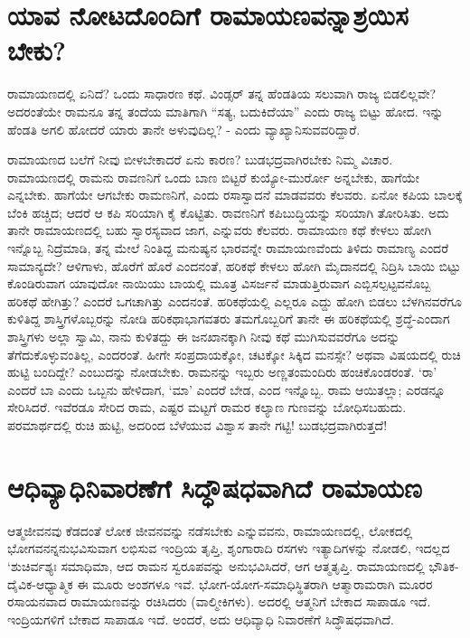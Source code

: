 \section*{ಯಾವ ನೋಟದೊಂದಿಗೆ ರಾಮಾಯಣವನ್ನಾಶ್ರಯಿಸ ಬೇಕು?}

ರಾಮಾಯಣದಲ್ಲಿ ಏನಿದೆ? ಒಂದು ಸಾಧಾರಣ ಕಥೆ. ವಿಂಡ್ಸರ್ ತನ್ನ ಹೆಂಡತಿಯ ಸಲುವಾಗಿ ರಾಜ್ಯ ಬಿಡಲಿಲ್ಲವೇ? ಅದರಂತೆಯೇ ರಾಮನೂ ತನ್ನ ತಂದೆಯ ಮಾತಿಗಾಗಿ ``ಸತ್ಯ, ಬದುಕಿದೆಯಾ'' ಎಂದು ರಾಜ್ಯ ಬಿಟ್ಟು ಹೋದ. ಇನ್ನು ಹೆಂಡತಿ ಅಗಲಿ ಹೋದರೆ ಯಾರು ತಾನೇ ಅಳುವುದಿಲ್ಲ? - ಎಂದು ವ್ಯಾಖ್ಯಾನಿಸುವವರಿದ್ದಾರೆ.

ರಾಮಾಯಣದ ಬಲೆಗೆ ನೀವು ಬೀಳಬೇಕಾದರೆ ಏನು ಕಾರಣ? ಬುಡಭದ್ರವಾಗಿರಬೇಕು ನಿಮ್ಮ ವಿಚಾರ. ರಾಮಾಯಣದಲ್ಲಿ ರಾಮನು ರಾವಣನಿಗೆ ಒಂದು ಬಾಣ ಬಿಟ್ಟರೆ ಕುಯ್ಯೋ-ಮುರ್ರೋ ಅನ್ನಬೇಕು, ಹಾಗೆಯೇ ಎನ್ನಬೇಕು. ಹಾಗೆಯೇ ಆಗಬೇಕು ರಾಮಣನಿಗೆ, ಎಂದು ರಸಾಸ್ವಾದನೆ ಮಾಡವವರು ಕೆಲವರು. ಏನೋ ಕಪಿಯ ಬಾಲಕ್ಕೆ ಬೆಂಕಿ ಹಚ್ಚಿದ; ಆದರೆ ಆ ಕಪಿ ಸರಿಯಾಗಿ ಕೈ ಕೊಟ್ಟಿತು. ರಾವಣನಿಗೆ ಕಪಿಬುದ್ಧಿಯನ್ನು ಸರಿಯಾಗಿ ತೋರಿಸಿತು. ಅದು ತಾನೇ ರಾಮಾಯಣದಲ್ಲಿ ಬಹು ಸ್ವಾರಸ್ಯವಾದ ಜಾಗ, ಎನ್ನುವರು ಕೆಲವರು. ರಾಮಾಯಣ ಕಥೆ ಕೇಳಲು ಹೋಗಿ ಇನ್ನೊಬ್ಬ ನಿದ್ರೆಮಾಡಿ, ತನ್ನ ಮೇಲೆ ನಿಂತಿದ್ದ ಮನುಷ್ಯನ ಭಾರವನ್ನೇ ರಾಮಾಯಣವೆಂದು ತಿಳಿದು ರಾಮಾಣ್ಯ ಎಂದರೆ ಸಾಮಾನ್ಯದೇ? ಆಳಿಗಾಳು, ಹೊರೆಗೆ ಹೊರೆ ಎಂದನಂತೆ, ಹರಿಕಥೆ ಕೇಳಲು ಹೋಗಿ ಮೈದಾನದಲ್ಲಿ ನಿದ್ರಿಸಿ ಬಾಯಿ ಬಿಟ್ಟು  ಕೊಂಡಿರುವಾಗ ಯಾವುದೋ ನಾಯಿಯು ಬಾಯಲ್ಲಿ ಮೂತ್ರ ವಿಸರ್ಜನೆ ಮಾಡುತ್ತಿರುವಾಗ ಎಬ್ಬಿಸಲ್ಪಟ್ಟವನೊಬ್ಬ ಹರಿಕಥೆ ಹೇಗಿತ್ತು? ಎಂದರೆ ಒಗಚಾಗಿತ್ತು ಎಂದನಂತೆ. ಹರಿಕಥೆಯಲ್ಲಿ ಎಲ್ಲರೂ ಎದ್ದು ಹೋಗಿ ಬಿಡಲು ಬೆಳಗಿನವರೆಗೂ ಕುಳಿತಿದ್ದ ಶಾಸ್ತ್ರಿಗಳೊಬ್ಬರನ್ನು ನೋಡಿ ಹರಿಕಥಾಭಾಗವತರು ತಮಗೊಬ್ಬರಿಗೆ ತಾನೇ ಈ ಹರಿಕಥೆಯಲ್ಲಿ ಶ್ರದ್ಧೆ-ಎಂದಾಗ ಶಾಸ್ತ್ರಿಗಳು ಅಲ್ಲಾ ಸ್ವಾಮಿ, ನಾನು ಕುಳಿತದ್ದು ಈ ಜನಖಾನಕ್ಕಾಗಿ ನೀವು ಕಥೆ ಮುಗಿಸುವವರೆಗೂ ಅದನ್ನು ತೆಗೆದುಕೊಳ್ಳುವಂತಿಲ್ಲ, ಎಂದರಂತೆ. ಹೀಗೇ ಸಂಪ್ರದಾಯಕ್ಕೋ, ಚಟಕ್ಕೋ ಸಿಕ್ಕಿದ ಮನಸ್ಸೇ? ಅಥವಾ ವಿಷಯದಲ್ಲಿ ರುಚಿ ಹುಟ್ಟಿ ಬಂದಿದ್ದೇ? ಎಂಬುದನ್ನು ನೋಡಬೇಕು. ರಾಮನನ್ನು ಇಬ್ಬರು ಅಣ್ಣತಂಮಂದಿರು ಹಂಚಿಕೊಂಡರಂತೆ. `ರಾ' ಎಂದರೆ ಬಾ ಎಂದು ಒಬ್ಬನು ಹೇಳಿದಾಗ, `ಮಾ' ಎಂದರೆ ಬೇಡ, ಎಂದ ಇನ್ನೊಬ್ಬ. ರಾಮ ಆಯಿತಲ್ಲಾ; ಎರಡನ್ನೂ ಸೇರಿಸಿದರೆ. ಇವೆರಡೂ ಸೇರಿದ ರಾಮ, ಎಷ್ಟರ ಮಟ್ಟಗೆ ರಾಮರ ಕಲ್ಯಾಣ ಗುಣವನ್ನು ಬೋಧಿಸಬಹುದು. ಪರಮಾರ್ಥದಲ್ಲಿ ರುಚಿ ಹುಟ್ಟಿ, ಅದರಿಂದ ಬೆಳೆಯುವ ವಿಶ್ವಾಸ ತಾನೇ ಗಟ್ಟಿ! ಬುಡಭದ್ರವಾಗಿರುತ್ತದೆ!

\section*{ಆಧಿವ್ಯಾಧಿನಿವಾರಣೆಗೆ ಸಿದ್ಧೌಷಧವಾಗಿದೆ ರಾಮಾಯಣ}

ಆತ್ಮಜೀವನವು ಕೆಡದಂತೆ ಲೋಕ ಜೀವನವನ್ನು ನಡೆಸಬೇಕು ಎನ್ನುವವನು, ರಾಮಾಯಣದಲ್ಲಿ, ಲೋಕದಲ್ಲಿ ಭೋಗವನನ್ನನುಭವಿಸುವಾಗ ಲಭಿಸುವ ಇಂದ್ರಿಯ ತೃಪ್ತಿ, ಶೃಂಗಾರಾದಿ ರಸಗಳು ಇತ್ಯಾದಿಗಳನ್ನು ನೋಡಲಿ, ಇದಲ್ಲದ `ಶುಚಿರ್ವಶ್ಯಃ ಸಮಾಧಿಮಾ, ಆದ ರಾಮನ ಸ್ವರೂಪವನ್ನು ಅನುಭವಿಸಿದರೆ, ಆಗ ಆತ್ಮತೃಪ್ತಿ. ರಾಮಾಯಣದಲ್ಲಿ ಭೌತಿಕ-ದೈವಿಕ-ಆಧ್ಯಾತ್ಮಿಕ ಈ ಮೂರು ಅಂಶಗಳೂ ಇವೆ. ಭೋಗ-ಯೋಗ-ಸಮಾಧಿಸ್ಥಿತರಾಗಿ ಆತ್ಮಾರಾಮರಾಗಿ ಮೂರರ ರಸಾಯನವಾದ ರಾಮಾಯಣವನ್ನು ರಚಿಸಿದರು (ವಾಲ್ಮೀಕಿಗಳು). ಅದರಲ್ಲಿ ಆತ್ಮನಿಗೆ ಬೇಕಾದ ಸಾಪಾಡೂ ಇದೆ. ಇಂದ್ರಿಯಗಳಿಗೆ ಬೇಕಾದ ಸಾಪಾಡೂ ಇದೆ. ಅಂದರೆ, ಅದು ಆಧಿವ್ಯಾಧಿ ನಿವಾರಣೆಗೆ ಸಿದ್ಧೌಷಧವಾಗಿದೆ.  

